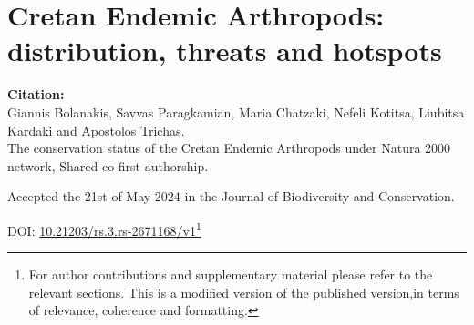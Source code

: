 % 
% 


\chapter{Cretan Endemic Arthropods: distribution, threats and hotspots}
\label{cha:arthropods}


\textbf{Citation:} \\ 
Giannis Bolanakis, Savvas Paragkamian, Maria Chatzaki, Nefeli Kotitsa, Liubitsa Kardaki and Apostolos Trichas.\\
The conservation status of the Cretan Endemic Arthropods under Natura 2000 network,
Shared co-first authorship.

Accepted the 21st of May 2024 in the Journal of Biodiversity and Conservation.

DOI: \href{https://doi.org/10.21203/rs.3.rs-2671168/v1}{10.21203/rs.3.rs-2671168/v1}\footnote{
   For author contributions and supplementary material please refer to the relevant sections. 
   This is a modified version of the published version,in terms of relevance, coherence and formatting.}


%
%

